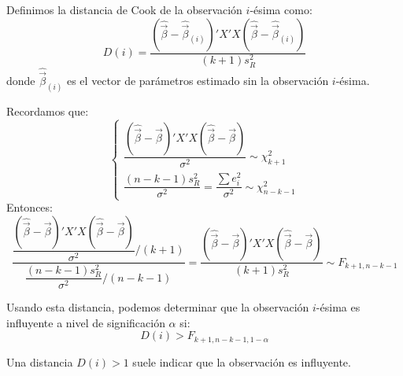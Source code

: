 Definimos la distancia de Cook de la observación $i$-ésima como:
$$D(i) = \frac{(\hat{\vec{\beta}}-\hat{\vec{\beta}}_{(i)})'X'X(\hat{\vec{\beta}}-\hat{\vec{\beta}}_{(i)})}{(k+1)s_R^2}$$
donde $\hat{\vec{\beta}}_{(i)}$ es el vector de parámetros estimado sin la observación $i$-ésima.

\begin{note}
    Recordamos que:
    $$\begin{cases}
            \dfrac{(\hat{\vec{\beta}}-\vec{\beta})'X'X(\hat{\vec{\beta}}-\vec{\beta})}{\sigma^2} \sim \chi^2_{k+1} \\
            \dfrac{(n-k-1)s_R^2}{\sigma^2} = \dfrac{\sum e_i^2}{\sigma^2} \sim \chi^2_{n-k-1}
        \end{cases}$$
    Entonces:
    $$\frac{\dfrac{(\hat{\vec{\beta}}-\vec{\beta})'X'X(\hat{\vec{\beta}}-\vec{\beta})}{\sigma^2} / (k+1)}{\dfrac{(n-k-1)s_R^2}{\sigma^2} / (n-k-1)} = \frac{(\hat{\vec{\beta}}-\vec{\beta})'X'X(\hat{\vec{\beta}}-\vec{\beta})}{(k+1)s_R^2} \sim F_{k+1, n-k-1}$$
\end{note}

Usando esta distancia, podemos determinar que la observación $i$-ésima es influyente a nivel de significación $\alpha$ si:
$$D(i) > F_{k+1, n-k-1, 1-\alpha}$$

\begin{note}
    Una distancia $D(i) > 1$ suele indicar que la observación es influyente.
\end{note}

